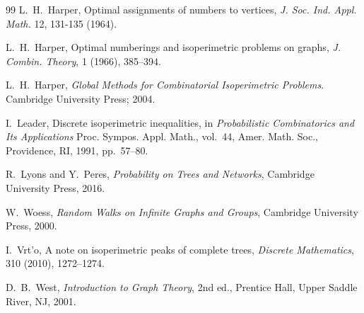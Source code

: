 \documentclass[a4paper, 11pt]{article}
\numberwithin{equation}{section}
\theoremstyle{definition}
\theoremstyle{remark}
\begin{document}
\begin{thebibliography}{99}
L.~H.~Harper,
\newblock Optimal assignments of numbers to vertices,
\newblock  \textit{J. Soc. Ind. Appl. Math. }12, 131-135 (1964). 

L.~H.~Harper,
\newblock Optimal numberings and isoperimetric problems on graphs,
\newblock \emph{J. Combin. Theory}, 1 (1966), 385--394.

L.~H.~Harper,
\textit{Global Methods for Combinatorial Isoperimetric Problems}. 
Cambridge University Press; 2004.

I.~Leader,
\newblock Discrete isoperimetric inequalities,
\newblock in \emph{Probabilistic Combinatorics and Its Applications}
  Proc. Sympos. Appl. Math., vol.~44,
  Amer. Math. Soc., Providence, RI, 1991, pp.~57--80.

R.~Lyons and Y.~Peres,
\newblock \emph{Probability on Trees and Networks},
\newblock Cambridge University Press, 2016.

W.~Woess,
\newblock \emph{Random Walks on Infinite Graphs and Groups},
\newblock Cambridge University Press, 2000.

I.~Vrt'o,
\newblock A note on isoperimetric peaks of complete trees,
\newblock \emph{Discrete Mathematics}, 310 (2010), 1272--1274.

D.~B.~West,
\emph{Introduction to Graph Theory},
2nd ed., Prentice Hall, Upper Saddle River, NJ, 2001.
\end{thebibliography}
\end{document}
